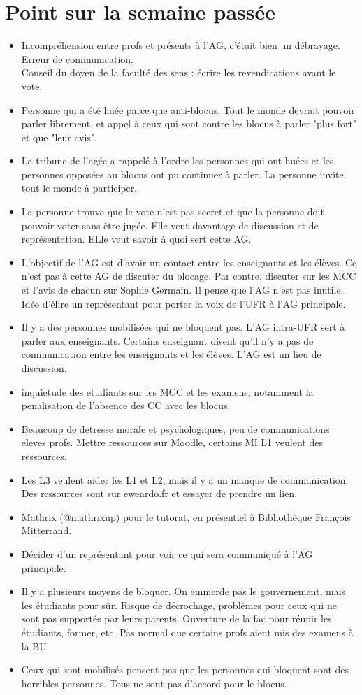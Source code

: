 \documentclass{article}
\begin{document}
\section{Point sur la semaine passée}
\begin{itemize}
    \item Incompréhension entre profs et présents à l'AG, c'était bien un débrayage. Erreur de communication.\\ 
    Conseil du doyen de la faculté des sens : écrire les revendications avant le vote.
    \item Personne qui a été huée parce que anti-blocus. Tout le monde devrait pouvoir parler librement, et appel à ceux qui sont contre les blocus à parler "plus fort" et que "leur avis".
    \item La tribune de l'agée a rappelé à l'ordre les personnes qui ont huées et les personnes opposées au blocus ont pu continuer à parler. La personne invite tout le monde à participer.
    \item La personne trouve que le vote n'est pas secret et que la personne doit pouvoir voter sans être jugée. Elle veut davantage de discussion et de représentation. ELle veut savoir à quoi sert cette AG.
    \item L'objectif de l'AG est d'avoir un contact entre les enseignants et les élèves. Ce n'est pas à cette AG de discuter du blocage. Par contre, discuter sur les MCC et l'avis de chacun sur Sophie Germain. Il pense que l'AG n'est pas inutile. Idée d'élire un représentant pour porter la voix de l'UFR à l'AG principale.
    \item Il y a des personnes mobilisées qui ne bloquent pas. L'AG intra-UFR sert à parler aux enseignants. Certains enseignant disent qu'il n'y a pas de communication entre les enseignants et les élèves. L'AG est un lieu de discussion.
    \item inquietude des etudiants sur les MCC et les examens, notamment la penalisation de l'absence des CC avec les blocus.
    \item Beaucoup de detresse morale et psychologiques, peu de communications eleves profs. Mettre ressources sur Moodle, certains MI L1 veulent des ressources.
    \item Les L3 veulent aider les L1 et L2, mais il y a un manque de communication. Des ressources sont sur ewenrdo.fr et essayer de prendre un lien.
    \item Mathrix (@mathrixup) pour le tutorat, en présentiel à Bibliothèque François Mitterrand.
    \item Décider d'un représentant pour voir ce qui sera communiqué à l'AG principale.
    \item Il y a plusieurs moyens de bloquer. On emmerde pas le gouvernement, mais les étudiants pour sûr. Risque de décrochage, problèmes pour ceux qui ne sont pas supportés par leurs parents. Ouverture de la fac pour réunir les étudiants, former, etc. Pas normal que certains profs aient mis des examens à la BU.
    \item Ceux qui sont mobilisés pensent pas que les personnes qui bloquent sont des horribles personnes. Tous ne sont pas d'accord pour le blocus.
\end{itemize}
\end{document}
